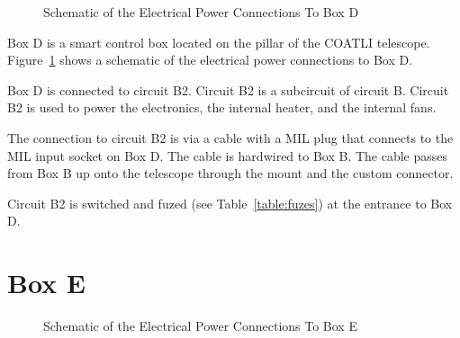 \begin{figure}
\begin{center}
\footnotesize 
{}
\end{center}
\caption{Schematic of the Electrical Power Connections To Box D}
\label{figure:schematic-electrical-power-box-d}
\end{figure}

Box D is a smart control box located on the pillar of the COATLI telescope. Figure~\ref{figure:schematic-electrical-power-box-d} shows a schematic of the electrical power connections to Box D.

Box D is connected to circuit B2. Circuit B2 is a subcircuit of circuit B. Circuit B2 is used to power the electronics, the internal heater, and the internal fans.

The connection to circuit B2 is via a cable with a MIL plug that connects to the MIL input socket on Box D. The cable is hardwired to Box B. The cable passes from Box B up onto the telescope through the mount and the custom connector.

Circuit B2 is switched and fuzed (see Table~\ref{table:fuzes}) at the entrance to Box D.

\section{Box E}

\begin{figure}
\begin{center}
\footnotesize 
{}
\end{center}
\caption{Schematic of the Electrical Power Connections To Box E}
\label{figure:schematic-electrical-power-box-e}
\end{figure}

